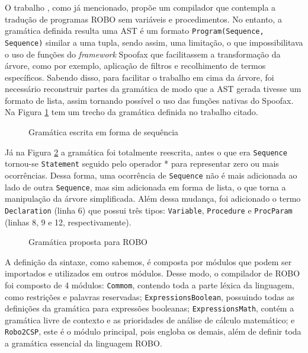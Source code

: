 O trabalho \cite{nogueira}, como já mencionado, propõe um compilador que contempla a tradução de programas ROBO sem variáveis e procedimentos. No entanto, a gramática definida resulta uma AST é um formato  \texttt{Program(Sequence, Sequence)} similar a uma tupla, sendo assim, uma limitação, o que impossibilitava o uso de funções do \textit{framework} Spoofax que facilitassem a transformação da árvore, como por exemplo, aplicação de filtros e recolhimento de termos específicos. Sabendo disso, para facilitar o trabalho em cima da árvore, foi necessário reconstruir partes da gramática de modo que a AST gerada tivesse um formato de lista, assim tornando possível o uso das funções nativas do Spoofax. Na Figura \ref{fig:gramatica_antes} tem um trecho da gramática definida no trabalho citado.

\begin{figure}[h]
\caption{Gramática escrita em forma de sequência}

\label{fig:gramatica_antes}
\end{figure}

Já na Figura \ref{fig:gramatica} a gramática foi totalmente reescrita, antes o que era \texttt{Sequence} tornou-se \texttt{Statement} seguido pelo operador * para representar zero ou mais ocorrências. Dessa forma, uma ocorrência de \texttt{Sequence} não é mais adicionada ao lado de outra \texttt{Sequence}, mas sim adicionada em forma de lista, o que torna a manipulação da árvore simplificada. Além dessa mudança, foi adicionado o termo \texttt{Declaration} (linha 6) que possui três tipos: \texttt{Variable}, \texttt{Procedure} e \texttt{ProcParam} (linhas 8, 9 e 12, respectivamente).

\begin{figure}[h]
\caption{Gramática proposta para ROBO}

\label{fig:gramatica}
\end{figure}

A definição da sintaxe, como sabemos, é composta por módulos que podem ser importados e utilizados em outros módulos. Desse modo, o compilador de ROBO foi composto de 4 módulos: \texttt{Commom}, contendo toda a parte léxica da linguagem, como restrições e palavras reservadas;  \texttt{ExpressionsBoolean}, possuindo todas as definições da gramática para expressões booleanas;  \texttt{ExpressionsMath}, contém a gramática livre de contexto e as prioridades de análise de cálculo matemático; e \texttt{Robo2CSP}, este é o módulo principal, pois engloba os demais, além de definir toda a gramática essencial da linguagem ROBO.

